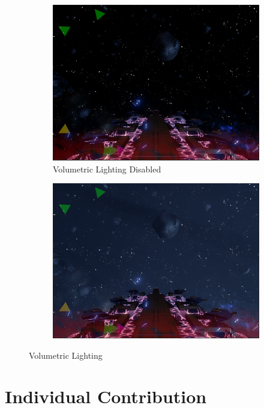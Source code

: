 \documentclass[a4paper,11pt]{article}
\begin{document}
\begin{figure}[ht]
	\centering
    
    \begin{subfigure}{.5\textwidth}
      \centering
      \includegraphics[width=.9\textwidth]{volumetricOff}
      \caption{Volumetric Lighting Disabled}
      \label{fig:volumetricOff}
    \end{subfigure}%
    \begin{subfigure}{.5\textwidth}
    	\centering
		\includegraphics[width=.9\textwidth]{volumetricOn}
        \label{fig:volumetricOn}
	\end{subfigure}
	\caption{Volumetric Lighting}
	\label{fig:volumetric}
\end{figure}

\clearpage

\section{Individual Contribution}
\end{document}
